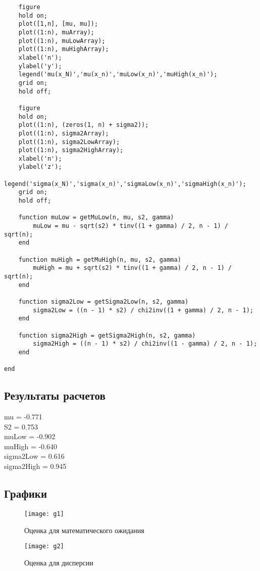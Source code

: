\documentclass[a4paper, 12pt]{article}
\theoremstyle{definition}
\begin{document}
\begin{lstlisting}
    figure 
    hold on;
    plot([1,n], [mu, mu]);
    plot((1:n), muArray);
    plot((1:n), muLowArray);
    plot((1:n), muHighArray);
    xlabel('n');
    ylabel('y');
    legend('mu(x_N)','mu(x_n)','muLow(x_n)','muHigh(x_n)');
    grid on;
    hold off;
    
    figure 
    hold on;
    plot((1:n), (zeros(1, n) + sigma2));
    plot((1:n), sigma2Array);
    plot((1:n), sigma2LowArray);
    plot((1:n), sigma2HighArray);
    xlabel('n');
    ylabel('z');
    legend('sigma(x_N)','sigma(x_n)','sigmaLow(x_n)','sigmaHigh(x_n)');
    grid on;
    hold off;
    
    function muLow = getMuLow(n, mu, s2, gamma)
        muLow = mu - sqrt(s2) * tinv((1 + gamma) / 2, n - 1) / sqrt(n);
    end

    function muHigh = getMuHigh(n, mu, s2, gamma)
        muHigh = mu + sqrt(s2) * tinv((1 + gamma) / 2, n - 1) / sqrt(n);
    end

    function sigma2Low = getSigma2Low(n, s2, gamma)
        sigma2Low = ((n - 1) * s2) / chi2inv((1 + gamma) / 2, n - 1);
    end

    function sigma2High = getSigma2High(n, s2, gamma)
        sigma2High = ((n - 1) * s2) / chi2inv((1 - gamma) / 2, n - 1);
    end

end
\end{lstlisting}

\subsection{Результаты расчетов}

mu = -0.771 \\
S2 = 0.753\\
muLow = -0.902\\
muHigh = -0.640\\
sigma2Low = 0.616\\
sigma2High = 0.945\\


\subsection{Графики}

	
	\begin{figure}[H]
        	\begin{center}
        		\texttt{[image: g1]}
        		\caption{Оценка для математического ожидания}
        		\label{fig:g1}
        	\end{center}
        \end{figure}

	\begin{figure}[H]
        	\begin{center}
        		\texttt{[image: g2]}
        		\caption{Оценка для дисперсии}
        		\label{fig:g2}
        	\end{center}
        \end{figure}
\end{document}
